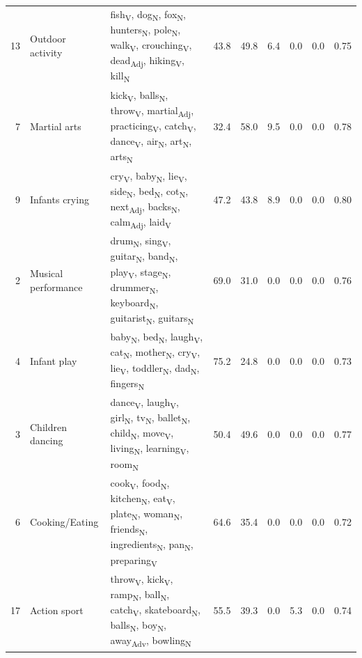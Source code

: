 \begin{landscape}
\begin{xltabular}{\linewidth}{r >{\raggedright\arraybackslash}p{2.9cm} >{\raggedright\arraybackslash}X r r r r r r}
13 & Outdoor activity & fish\textsubscript{V}, dog\textsubscript{N}, fox\textsubscript{N}, hunters\textsubscript{N}, pole\textsubscript{N}, walk\textsubscript{V}, crouching\textsubscript{V}, dead\textsubscript{Adj}, hiking\textsubscript{V}, kill\textsubscript{N} & 43.8 & 49.8 & 6.4 & 0.0 & 0.0 & 0.75 \\
7 & Martial arts & kick\textsubscript{V}, balls\textsubscript{N}, throw\textsubscript{V}, martial\textsubscript{Adj}, practicing\textsubscript{V}, catch\textsubscript{V}, dance\textsubscript{V}, air\textsubscript{N}, art\textsubscript{N}, arts\textsubscript{N} & 32.4 & 58.0 & 9.5 & 0.0 & 0.0 & 0.78 \\
9 & Infants crying & cry\textsubscript{V}, baby\textsubscript{N}, lie\textsubscript{V}, side\textsubscript{N}, bed\textsubscript{N}, cot\textsubscript{N}, next\textsubscript{Adj}, backs\textsubscript{N}, calm\textsubscript{Adj}, laid\textsubscript{V} & 47.2 & 43.8 & 8.9 & 0.0 & 0.0 & 0.80 \\
2 & Musical performance & drum\textsubscript{N}, sing\textsubscript{V}, guitar\textsubscript{N}, band\textsubscript{N}, play\textsubscript{V}, stage\textsubscript{N}, drummer\textsubscript{N}, keyboard\textsubscript{N}, guitarist\textsubscript{N}, guitars\textsubscript{N} & 69.0 & 31.0 & 0.0 & 0.0 & 0.0 & 0.76 \\
4 & Infant play & baby\textsubscript{N}, bed\textsubscript{N}, laugh\textsubscript{V}, cat\textsubscript{N}, mother\textsubscript{N}, cry\textsubscript{V}, lie\textsubscript{V}, toddler\textsubscript{N}, dad\textsubscript{N}, fingers\textsubscript{N} & 75.2 & 24.8 & 0.0 & 0.0 & 0.0 & 0.73 \\
3 & Children dancing & dance\textsubscript{V}, laugh\textsubscript{V}, girl\textsubscript{N}, tv\textsubscript{N}, ballet\textsubscript{N}, child\textsubscript{N}, move\textsubscript{V}, living\textsubscript{N}, learning\textsubscript{V}, room\textsubscript{N} & 50.4 & 49.6 & 0.0 & 0.0 & 0.0 & 0.77 \\
6 & Cooking/Eating & cook\textsubscript{V}, food\textsubscript{N}, kitchen\textsubscript{N}, eat\textsubscript{V}, plate\textsubscript{N}, woman\textsubscript{N}, friends\textsubscript{N}, ingredients\textsubscript{N}, pan\textsubscript{N}, preparing\textsubscript{V} & 64.6 & 35.4 & 0.0 & 0.0 & 0.0 & 0.72 \\
17 & Action sport & throw\textsubscript{V}, kick\textsubscript{V}, ramp\textsubscript{N}, ball\textsubscript{N}, catch\textsubscript{V}, skateboard\textsubscript{N}, balls\textsubscript{N}, boy\textsubscript{N}, away\textsubscript{Adv}, bowling\textsubscript{N} & 55.5 & 39.3 & 0.0 & 5.3 & 0.0 & 0.74 \\

\end{xltabular}
\end{landscape}

